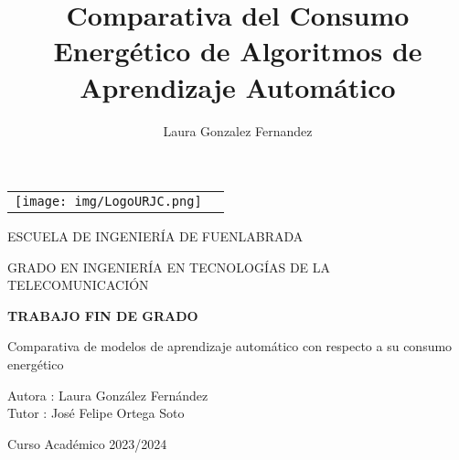 \documentclass[a4paper, 12pt, oneside]{book}
\title{Comparativa del Consumo Energético de Algoritmos de Aprendizaje Automático}
\author{Laura Gonzalez Fernandez}
\begin{document}
 


\begin{titlepage}
\begin{center}
\begin{tabular}[c]{c c}
\texttt{[image: img/LogoURJC.png]}
\\
\end{tabular}

\vspace{1.5cm}

\Large 
ESCUELA DE INGENIERÍA DE FUENLABRADA

\vspace{1.2cm}

\Large 
GRADO EN INGENIERÍA EN TECNOLOGÍAS DE LA TELECOMUNICACIÓN

\vspace{0.8cm}
\LARGE 
\textbf{\uppercase{Trabajo Fin de Grado}}

\vspace{2cm}

\LARGE Comparativa de modelos de aprendizaje automático con respecto a su consumo energético
\vspace{2cm}

\large
Autora : Laura González Fernández \\
Tutor : José Felipe Ortega Soto

\vspace{0.8cm}
\large
Curso Académico 2023/2024

\end{center}
\end{titlepage}


\newpage
\mbox{}


\clearpage
\frontmatter
\pagestyle{empty}
\end{document}
